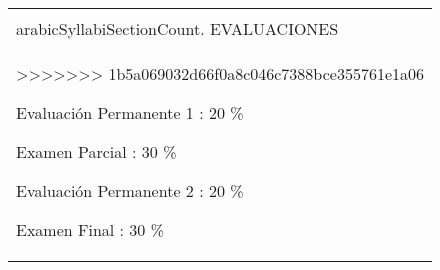 \documentclass[final]{article}
\begin{document}
\begin{center}
\begin{tabularx}{\textwidth}{|X|}
\begin{evaluation}
\begin{document}
\addtocounter{SyllabiSectionCount}{1}
\begin{center}
\begin{tabularx}{\textwidth}{|X|}      \hline
\\arabic{SyllabiSectionCount}. EVALUACIONES  \\ \hline
\begin{evaluation}
>>>>>>> 1b5a069032d66f0a8c046c7388bce355761e1a06
	\item[Evaluación Permanente 1] : 20 \%
	\item[Examen Parcial] : 30 \%
	\item[Evaluación Permanente 2] : 20 \%
	\item[Examen Final] : 30 \%
	\end{evaluation}
	\\ \hline
	\end{tabularx}
	\end{center}
	
	
	
	
\end{document}
